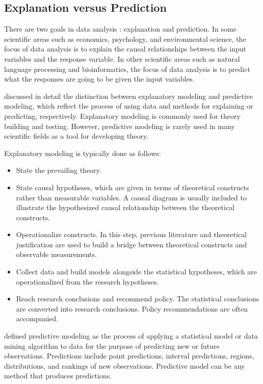 \documentclass[]{book}
\theoremstyle{definition}
\theoremstyle{definition}
\theoremstyle{definition}
\theoremstyle{remark}
\begin{document}
\subsection{Explanation versus Prediction}\label{S:expred}

There are two goals in data analysis
\citep{breiman2001modeling, shmueli2010model}: explanation and
prediction. In some scientific areas such as economics, psychology, and
environmental science, the focus of data analysis is to explain the
causal relationships between the input variables and the response
variable. In other scientific areas such as natural language processing
and bioinformatics, the focus of data analysis is to predict what the
responses are going to be given the input variables.

\citet{shmueli2010model} discussed in detail the distinction between
explanatory modeling and predictive modeling, which reflect the process
of using data and methods for explaining or predicting, respectively.
Explanatory modeling is commonly used for theory building and testing.
However, predictive modeling is rarely used in many scientific fields as
a tool for developing theory.

Explanatory modeling is typically done as follows:

\begin{itemize}
\item
  State the prevailing theory.
\item
  State causal hypotheses, which are given in terms of theoretical
  constructs rather than measurable variables. A causal diagram is
  usually included to illustrate the hypothesized causal relationship
  between the theoretical constructs.
\item
  Operationalize constructs. In this step, previous literature and
  theoretical justification are used to build a bridge between
  theoretical constructs and observable measurements.
\item
  Collect data and build models alongside the statistical hypotheses,
  which are operationalized from the research hypotheses.
\item
  Reach research conclusions and recommend policy. The statistical
  conclusions are converted into research conclusions. Policy
  recommendations are often accompanied.
\end{itemize}

\citet{shmueli2010model} defined predictive modeling as the process of
applying a statistical model or data mining algorithm to data for the
purpose of predicting new or future observations. Predictions include
point predictions, interval predictions, regions, distributions, and
rankings of new observations. Predictive model can be any method that
produces predictions.
\end{document}
